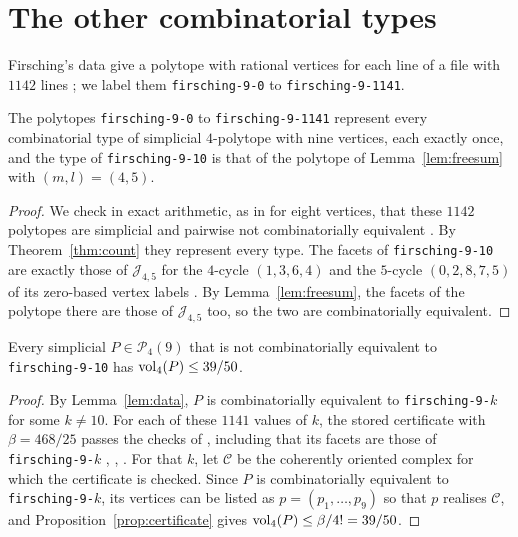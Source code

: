 \section{The other combinatorial types}
\label{sec:rivals}

Firsching's data \cite{firsching-2017} give a polytope with rational
vertices for each line of a file with $1142$ lines ; we label
them \texttt{firsching-9-0} to \texttt{firsching-9-1141}.

\begin{lemma}
  \label{lem:data}
  The polytopes \texttt{firsching-9-0} to \texttt{firsching-9-1141} represent
  every combinatorial type of simplicial $4$-polytope with nine vertices, each
  exactly once, and the type of \texttt{firsching-9-10} is that of the
  polytope of Lemma~\ref{lem:freesum} with $(m, l) = (4, 5)$.
\end{lemma}

\begin{proof}
  We check in exact arithmetic, as in \cite[Remark~2.14]{medgyes-maxvol-d4}
  for eight vertices, that these $1142$ polytopes are simplicial and pairwise
  not combinatorially equivalent . By
  Theorem~\ref{thm:count} they represent every type. The facets of
  \texttt{firsching-9-10} are exactly those of $\mathcal{J}_{4,5}$ for the
  $4$-cycle $(1, 3, 6, 4)$ and the $5$-cycle $(0, 2, 8, 7, 5)$ of its
  zero-based vertex labels . By Lemma~\ref{lem:freesum}, the
  facets of the polytope there are those of $\mathcal{J}_{4,5}$ too, so the two
  are combinatorially equivalent.
\end{proof}

\begin{proposition}
  \label{prop:rivals}
  Every simplicial $P \in \mathcal{P}_{4}(9)$ that is not combinatorially
  equivalent to \texttt{firsching-9-10} has $\operatorname{vol}_{4}(P) \leq 39/50$.
\end{proposition}

\begin{proof}
  By Lemma~\ref{lem:data}, $P$ is combinatorially equivalent to
  \texttt{firsching-9-$k$} for some $k \neq 10$. For each of these $1141$
  values of $k$, the stored
  certificate with $\beta = 468/25$ passes the checks of
  \cite[Section~3.3]{medgyes-maxvol-d4}, including that its facets are those
  of \texttt{firsching-9-$k$} , ,
  . For that $k$, let $\mathcal{C}$ be the coherently
  oriented complex for which the certificate is checked. Since $P$ is
  combinatorially equivalent to \texttt{firsching-9-$k$}, its vertices can be
  listed as $p = (p_{1}, \ldots, p_{9})$ so that $p$ realises $\mathcal{C}$,
  and Proposition~\ref{prop:certificate} gives
  $\operatorname{vol}_{4}(P) \leq \beta/4! = 39/50$.
\end{proof}
